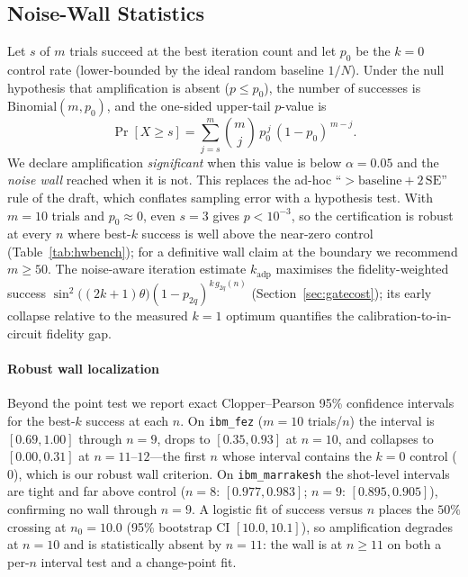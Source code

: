 \documentclass[journal]{IEEEtran}
\begin{document}
\subsection{Noise-Wall Statistics}
\label{sec:wallstats}
Let $s$ of $m$ trials succeed at the best iteration count and let $p_0$ be the
$k{=}0$ control rate (lower-bounded by the ideal random baseline $1/N$). Under the
null hypothesis that amplification is absent ($p\le p_0$), the number of
successes is $\mathrm{Binomial}(m,p_0)$, and the one-sided upper-tail $p$-value is
\begin{equation}
\Pr[X\ge s] = \sum_{j=s}^{m}\binom{m}{j}\,p_0^{\,j}\,(1-p_0)^{\,m-j}.
\label{eq:binom}
\end{equation}
We declare amplification \emph{significant} when this value is below
$\alpha{=}0.05$ and the \emph{noise wall} reached when it is not. This replaces the
ad-hoc ``$>\!\text{baseline}+2\,\mathrm{SE}$'' rule of the draft, which conflates
sampling error with a hypothesis test. With $m{=}10$ trials and $p_0\!\approx\!0$,
even $s{=}3$ gives $p<10^{-3}$, so the certification is robust at every $n$ where
best-$k$ success is well above the near-zero control (Table~\ref{tab:hwbench});
for a definitive wall claim at the boundary we recommend $m\!\ge\!50$. The
noise-aware iteration estimate $k_{\mathrm{adp}}$ maximises the fidelity-weighted
success $\sin^2\!\big((2k{+}1)\theta\big)(1{-}p_{2q})^{k\,g_{2q}(n)}$
(Section~\ref{sec:gatecost}); its early collapse relative to the measured $k{=}1$
optimum quantifies the calibration-to-in-circuit fidelity gap.

\paragraph{Robust wall localization}
Beyond the point test we report exact Clopper--Pearson 95\% confidence intervals
for the best-$k$ success at each $n$. On \texttt{ibm\_fez} ($m{=}10$ trials/$n$)
the interval is $[0.69,1.00]$ through $n{=}9$, drops to $[0.35,0.93]$ at $n{=}10$,
and collapses to $[0.00,0.31]$ at $n{=}11$--$12$---the first $n$ whose interval
contains the $k{=}0$ control ($0$), which is our robust wall criterion. On
\texttt{ibm\_marrakesh} the shot-level intervals are tight and far above control
($n{=}8$: $[0.977,0.983]$; $n{=}9$: $[0.895,0.905]$), confirming no wall through
$n{=}9$. A logistic fit of success versus $n$ places the $50\%$ crossing at
$n_0{=}10.0$ (95\% bootstrap CI $[10.0,10.1]$), so amplification degrades at
$n{=}10$ and is statistically absent by $n{=}11$: the wall is at $n\!\ge\!11$ on
both a per-$n$ interval test and a change-point fit.
\end{document}
